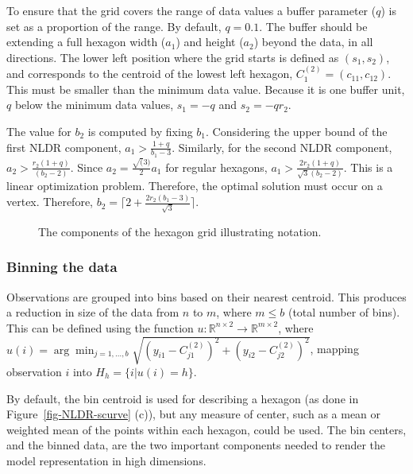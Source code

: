 \documentclass[
  12pt]{article}
\begin{document}
To ensure that the grid covers the range of data values a buffer
parameter (\(q\)) is set as a proportion of the range. By default,
\(q=0.1\). The buffer should be extending a full hexagon width (\(a_1\))
and height (\(a_2\)) beyond the data, in all directions. The lower left
position where the grid starts is defined as \((s_1, s_2)\), and
corresponds to the centroid of the lowest left hexagon,
\(C_{1}^{(2)} = (c_{11}, c_{12})\). This must be smaller than the
minimum data value. Because it is one buffer unit, \(q\) below the
minimum data values, \(s_1 = -q\) and \(s_2 = -qr_2\).

The value for \(b_2\) is computed by fixing \(b_1\). Considering the
upper bound of the first NLDR component, \(a_1 > \frac{1+q}{b_1 -3}\).
Similarly, for the second NLDR component,
\(a_2 > \frac{r_2(1 + q)}{(b_2 - 2)}\). Since
\(a_2 = \frac{\sqrt(3)}{2}a_1\) for regular hexagons,
\(a_1 > \frac{2r_2(1 + q)}{\sqrt{3}(b_2 - 2)}\). This is a linear
optimization problem. Therefore, the optimal solution must occur on a
vertex. Therefore,
\(b_2 = \Big\lceil2 +\frac{2r_2(b_1 - 3)}{\sqrt{3}}\Big\rceil\).

\begin{figure}[H]


\caption{\label{fig-hex-param}The components of the hexagon grid
illustrating notation.}

\end{figure}%

\subsubsection{Binning the data}\label{binning-the-data}

Observations are grouped into bins based on their nearest centroid. This
produces a reduction in size of the data from \(n\) to \(m\), where
\(m\leq b\) (total number of bins). This can be defined using the
function
\(u: \mathbb{R}^{n\times 2} \rightarrow \mathbb{R}^{m\times 2}\), where
\(u(i) = \arg\min_{j = 1, \dots, b} \sqrt{(y_{i1} - C^{(2)}_{j1})^2 + (y_{i2} - C^{(2)}_{j2})^2}\),
mapping observation \(i\) into \(H_h = \{i| u(i) = h\}\).

By default, the bin centroid is used for describing a hexagon (as done
in Figure~\ref{fig-NLDR-scurve} (c)), but any measure of center, such as
a mean or weighted mean of the points within each hexagon, could be
used. The bin centers, and the binned data, are the two important
components needed to render the model representation in high dimensions.
\end{document}
